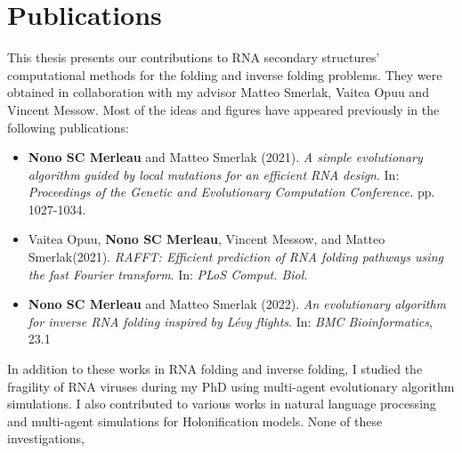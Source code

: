 \chapter*{Publications}
This thesis presents our contributions to RNA secondary structures' computational methods for the folding and inverse folding problems. They were obtained in collaboration with my advisor Matteo Smerlak, Vaitea Opuu and Vincent Messow. Most of the ideas and figures have appeared previously in the following publications: 


\begin{itemize}
	
	\item \cite{merleau2021simple} \textbf{Nono SC Merleau} and Matteo Smerlak (2021). \emph{A simple evolutionary algorithm guided by local mutations for an efficient RNA design}. In: \textit{Proceedings of the Genetic and Evolutionary Computation Conference.} pp. 1027-1034. %
	
	\item  \cite{opuu2021rafft} Vaitea Opuu, \textbf{Nono SC Merleau}, Vincent Messow, and Matteo Smerlak(2021). \emph{RAFFT: Efficient prediction of RNA folding pathways using the fast Fourier transform}. In: \textit{PLoS Comput. Biol.}
	
	\item \cite{merleau2022evolutionary} \textbf{Nono SC Merleau}  and Matteo Smerlak (2022). \emph{An evolutionary algorithm for inverse RNA folding inspired by Lévy flights}. In: \textit{BMC Bioinformatics}, 23.1
\end{itemize}
In addition to these works in RNA folding and inverse folding, I studied the fragility of RNA viruses during my PhD using multi-agent evolutionary algorithm simulations. I also contributed to various works in natural language processing and multi-agent simulations for Holonification models. 
None of these investigations,

